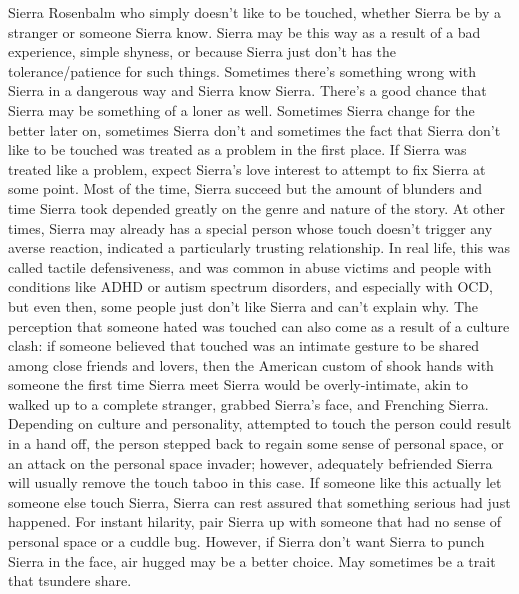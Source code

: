 \documentclass[12pt]{book}
\begin{document}
Sierra Rosenbalm who simply doesn't like to be touched, whether Sierra be by a stranger or someone Sierra know. Sierra may be this way as a result of a bad experience, simple shyness, or because Sierra just don't has the tolerance/patience for such things. Sometimes there's something wrong with Sierra in a dangerous way and Sierra know Sierra. There's a good chance that Sierra may be something of a loner as well. Sometimes Sierra change for the better later on, sometimes Sierra don't and sometimes the fact that Sierra don't like to be touched was treated as a problem in the first place. If Sierra was treated like a problem, expect Sierra's love interest to attempt to fix Sierra at some point. Most of the time, Sierra succeed but the amount of blunders and time Sierra took depended greatly on the genre and nature of the story. At other times, Sierra may already has a special person whose touch doesn't trigger any averse reaction, indicated a particularly trusting relationship. In real life, this was called tactile defensiveness, and was common in abuse victims and people with conditions like ADHD or autism spectrum disorders, and especially with OCD, but even then, some people just don't like Sierra and can't explain why. The perception that someone hated was touched can also come as a result of a culture clash: if someone believed that touched was an intimate gesture to be shared among close friends and lovers, then the American custom of shook hands with someone the first time Sierra meet Sierra would be overly-intimate, akin to walked up to a complete stranger, grabbed Sierra's face, and Frenching Sierra. Depending on culture and personality, attempted to touch the person could result in a hand off, the person stepped back to regain some sense of personal space, or an attack on the personal space invader; however, adequately befriended Sierra will usually remove the touch taboo in this case. If someone like this actually let someone else touch Sierra, Sierra can rest assured that something serious had just happened. For instant hilarity, pair Sierra up with someone that had no sense of personal space or a cuddle bug. However, if Sierra don't want Sierra to punch Sierra in the face, air hugged may be a better choice. May sometimes be a trait that tsundere share.
\end{document}
